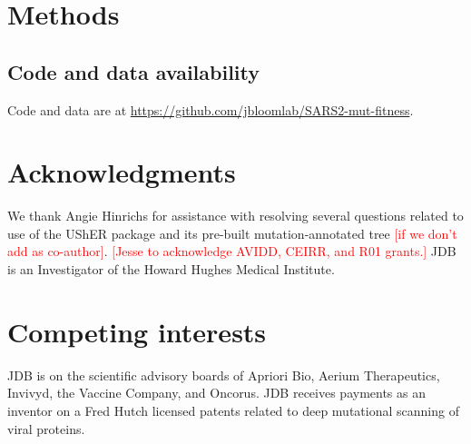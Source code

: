 \documentclass[9pt,twocolumn,twoside]{gsajnl_modified}
\newcommand\jdbcomment[1]{\textcolor{red}{[#1]}}
\begin{document}
{\small

\section{Methods}
\subsection{Code and data availability}
Code and data are at \url{https://github.com/jbloomlab/SARS2-mut-fitness}.

\section{Acknowledgments}
We thank Angie Hinrichs for assistance with resolving several questions related to use of the UShER package and its pre-built mutation-annotated tree \jdbcomment{if we don't add as co-author}.
\jdbcomment{Jesse to acknowledge AVIDD, CEIRR, and R01 grants.}
JDB is an Investigator of the Howard Hughes Medical Institute.

\section{Competing interests}
JDB is on the scientific advisory boards of Apriori Bio, Aerium Therapeutics, Invivyd, the Vaccine Company, and Oncorus.
JDB receives payments as an inventor on a Fred Hutch licensed patents related to deep mutational scanning of viral proteins.


}
\end{document}
